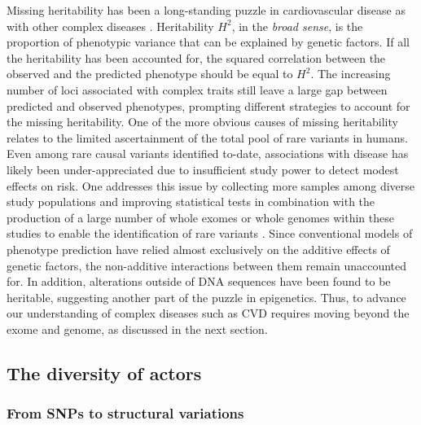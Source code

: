 \documentclass[letter]{bioinfo}
\begin{document}
Missing heritability has been a long-standing puzzle in cardiovascular disease as with other complex diseases \citep{Manolio:2009:Finding}. Heritability $H^2$, in the \textit{broad sense}, is the proportion of phenotypic variance that can be explained by genetic factors.
If all the heritability has been accounted for, the squared correlation between the observed and the predicted phenotype should be equal to $H^2$. The increasing number of loci associated with complex traits still leave a large gap between predicted and observed phenotypes, prompting different strategies to account for the missing heritability.  One of the more obvious causes of missing heritability relates to the limited ascertainment of the total pool of rare variants in humans. Even among rare causal variants identified to-date, associations with disease has likely been under-appreciated due to insufficient study power to detect modest effects on risk. One addresses this issue by collecting more samples among diverse study populations \citep{Visscher:2017:10} and improving statistical tests \citep{Zuk:2014:Searching,Kaakinen:2017:rarevariant} in combination with the production of a large number of whole exomes or whole genomes within these studies to enable the identification of rare variants \citep{Lek:2016:Analysis}. Since conventional models of phenotype prediction have relied almost exclusively on the additive effects of genetic factors, the non-additive interactions between them remain unaccounted for. In addition, alterations outside of DNA sequences have been found to be heritable, suggesting another part of the puzzle in epigenetics. Thus, to advance our understanding of complex diseases such as CVD requires moving beyond the exome and genome, as discussed in the next section.
	
	
\subsection*{The diversity of actors}

\subsubsection*{From SNPs to structural variations}
\end{document}
